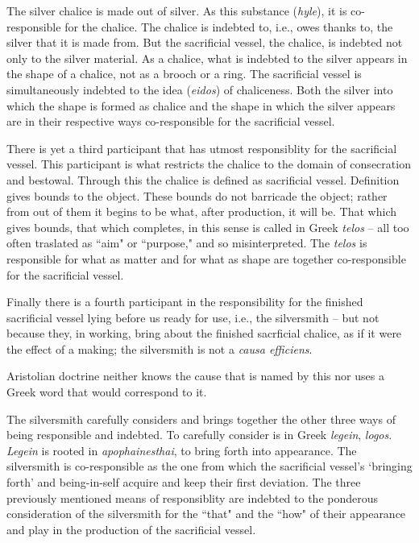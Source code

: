 \documentclass[paper=a4, fontsize=11pt,twoside]{scrartcl}
\begin{document}
The silver chalice is made out of silver. As this substance (\textit{hyle}), it is co-responsible for the chalice. The chalice is indebted to, i.e., owes thanks to, the silver that it is made from. But the sacrificial vessel, the chalice, is indebted not only to the silver material. As a chalice, what is indebted to the silver appears in the shape of a chalice, not as a brooch or a ring. The sacrificial vessel is simultaneously indebted to the idea (\textit{eidos}) of chaliceness. Both the silver into which the shape is formed as chalice and the shape in which the silver appears are in their respective ways co-responsible for the sacrificial vessel.

There is yet a third participant that has utmost responsiblity for the sacrificial vessel. This participant is what restricts the chalice to the domain of consecration and bestowal. Through this the chalice is defined as sacrificial vessel. Definition gives bounds to the object. These bounds do not barricade the object; rather from out of them it begins to be what, after production, it will be. That which gives bounds, that which completes, in this sense is called in Greek \textit{telos} -- all too often traslated as ``aim" or ``purpose," and so misinterpreted. The \textit{telos} is responsible for what as matter and for what as shape are together co-responsible for the sacrificial vessel.

Finally there is a fourth participant in the responsibility for the finished sacrificial vessel lying before us ready for use, i.e., the silversmith -- but not because they, in working, bring about the finished sacrficial chalice, as if it were the effect of a making; the silversmith is not a \textit{causa efficiens}.

Aristolian doctrine neither knows the cause that is named by this nor uses a Greek word that would correspond to it.

The silversmith carefully considers and brings together the other three ways of being responsible and indebted. To carefully consider is in Greek \textit{legein}, \textit{logos}. \textit{Legein} is rooted in \textit{apophainesthai}, to bring forth into appearance. The silversmith is co-responsible as the one from which the sacrificial vessel's `bringing forth' and being-in-self acquire and keep their first deviation. The three previously mentioned means of responsiblity are indebted to the ponderous consideration of the silversmith for the ``that" and the ``how" of their appearance and play in the production of the sacrificial vessel.
\end{document}
